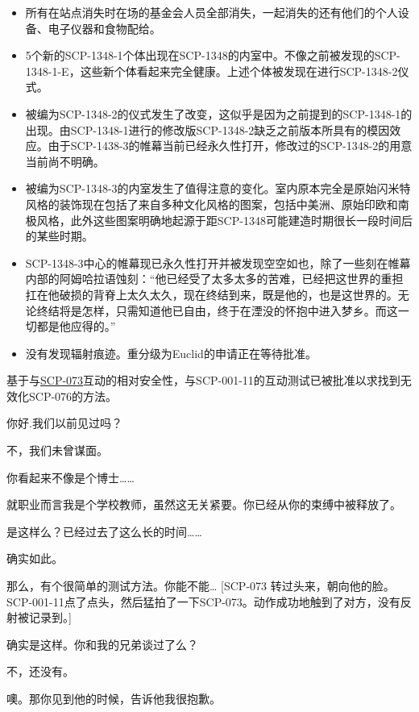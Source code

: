 \begin{itemize}
\item 所有在站点消失时在场的基金会人员全部消失，一起消失的还有他们的个人设备、电子仪器和食物配给。
\item 5个新的SCP-1348-1个体出现在SCP-1348的内室中。不像之前被发现的SCP-1348-1-E，这些新个体看起来完全健康。上述个体被发现在进行SCP-1348-2仪式。
\item 被编为SCP-1348-2的仪式发生了改变，这似乎是因为之前提到的SCP-1348-1的出现。由SCP-1348-1进行的修改版SCP-1348-2缺乏之前版本所具有的模因效应。由于SCP-1438-3的帷幕当前已经永久性打开，修改过的SCP-1348-2的用意当前尚不明确。
\item 被编为SCP-1348-3的内室发生了值得注意的变化。室内原本完全是原始闪米特风格的装饰现在包括了来自多种文化风格的图案，包括中美洲、原始印欧和南极风格，此外这些图案明确地起源于距SCP-1348可能建造时期很长一段时间后的某些时期。
\item SCP-1348-3中心的帷幕现已永久性打开并被发现空空如也，除了一些刻在帷幕内部的阿姆哈拉语蚀刻：“他已经受了太多太多的苦难，已经把这世界的重担扛在他破损的背脊上太久太久，现在终结到来，既是他的，也是这世界的。无论终结将是怎样，只需知道他已自由，终于在湮没的怀抱中进入梦乡。而这一切都是他应得的。”
\item 没有发现辐射痕迹。重分级为Euclid的申请正在等待批准。
\end{itemize}


基于与\hyperref[chap:SCP-073]{SCP-073}互动的相对安全性，与SCP-001-11的互动测试已被批准以求找到无效化SCP-076的方法。

\begin{scpbox}


你好.我们以前见过吗？

不，我们未曾谋面。

你看起来不像是个博士……

就职业而言我是个学校教师，虽然这无关紧要。你已经从你的束缚中被释放了。

是这样么？已经过去了这么长的时间……

确实如此。

那么，有个很简单的测试方法。你能不能… {[}SCP-073 转过头来，朝向他的脸。SCP-001-11点了点头，然后猛拍了一下SCP-073。动作成功地触到了对方，没有反射被记录到。]

确实是这样。你和我的兄弟谈过了么？

不，还没有。

噢。那你见到他的时候，告诉他我很抱歉。


\end{scpbox}

